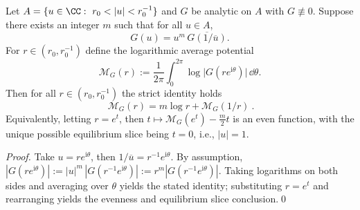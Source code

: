 \begin{proposition}\label{prop:xi-selfdual-mean-potential-inversion}
Let \(A=\{u\in\CC:\ r_0<|u|<r_0^{-1}\}\) and \(G\) be analytic on \(A\) with \(G\not\equiv 0\).
Suppose there exists an integer \(m\) such that for all \(u\in A\),
\[
G(u)=u^{m}\,\overline{G(1/\overline{u})}.
\]
For \(r\in(r_0,r_0^{-1})\) define the logarithmic average potential
\[
\mathcal{M}_G(r):=\frac{1}{2\pi}\int_{0}^{2\pi}\log\bigl|G(re^{\mathrm{i}\theta})\bigr|\,\dd\theta.
\]
Then for all \(r\in(r_0,r_0^{-1})\) the strict identity holds
\[
\boxed{\ \mathcal{M}_G(r)=m\log r+\mathcal{M}_G(1/r)\ }.
\]
Equivalently, letting \(r=e^t\), then \(t\mapsto \mathcal{M}_G(e^t)-\frac{m}{2}t\) is an even function, with the unique possible equilibrium slice being \(t=0\), i.e., \(|u|=1\).
\end{proposition}

\begin{proof}
Take \(u=re^{\mathrm{i}\theta}\), then \(1/\overline{u}=r^{-1}e^{\mathrm{i}\theta}\).
By assumption,
\(
|G(re^{\mathrm{i}\theta})|
:=|u|^{m}\,|G(r^{-1}e^{\mathrm{i}\theta})|
:=r^{m}|G(r^{-1}e^{\mathrm{i}\theta})|
\).
Taking logarithms on both sides and averaging over \(\theta\) yields the stated identity; substituting \(r=e^t\) and rearranging yields the evenness and equilibrium slice conclusion.\qed
\end{proof}

